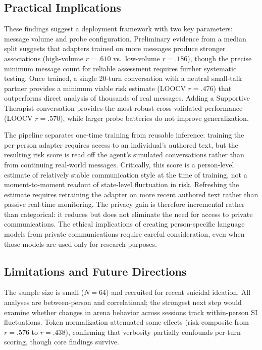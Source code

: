 \documentclass[review,12pt,authoryear]{elsarticle}
\begin{document}
\subsection{Practical Implications}

These findings suggest a deployment framework with two key parameters: message volume and probe configuration. Preliminary evidence from a median split suggests that adapters trained on more messages produce stronger associations (high-volume $r = .610$ vs.\ low-volume $r = .186$), though the precise minimum message count for reliable assessment requires further systematic testing. Once trained, a single 20-turn conversation with a neutral small-talk partner provides a minimum viable risk estimate (LOOCV $r = .476$) that outperforms direct analysis of thousands of real messages. Adding a Supportive Therapist conversation provides the most robust cross-validated performance (LOOCV $r = .570$), while larger probe batteries do not improve generalization.

The pipeline separates one-time training from reusable inference: training the per-person adapter requires access to an individual's authored text, but the resulting risk score is read off the agent's simulated conversations rather than from continuing real-world messages. Critically, this score is a person-level estimate of relatively stable communication style at the time of training, not a moment-to-moment readout of state-level fluctuation in risk. Refreshing the estimate requires retraining the adapter on more recent authored text rather than passive real-time monitoring. The privacy gain is therefore incremental rather than categorical: it reduces but does not eliminate the need for access to private communications. The ethical implications of creating person-specific language models from private communications require careful consideration, even when those models are used only for research purposes.

\subsection{Limitations and Future Directions}

The sample size is small ($N = 64$) and recruited for recent suicidal ideation. All analyses are between-person and correlational; the strongest next step would examine whether changes in arena behavior across sessions track within-person SI fluctuations. Token normalization attenuated some effects (risk composite from $r = .576$ to $r = .438$), confirming that verbosity partially confounds per-turn scoring, though core findings survive.
\end{document}
